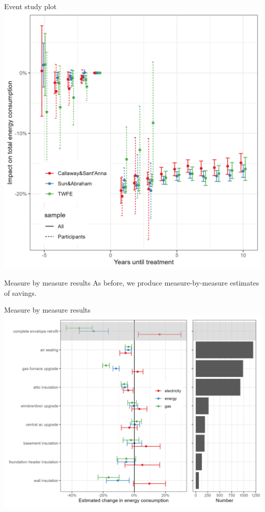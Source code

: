 \documentclass[8pt]{beamer}
\begin{document}
\begin{frame}{Event study plot}
	\centering
	\includegraphics[width=0.75\linewidth]{../output_figures_tables/event_study_plot.png}
\end{frame}


\begin{frame}{Measure by measure results}
	As before, we produce measure-by-measure estimates of savings.
\end{frame}

\begin{frame}{Measure by measure results}
	\includegraphics[width=\linewidth]{../output_figures_tables/mbm_energy_savings_combined}
\end{frame}
\end{document}
